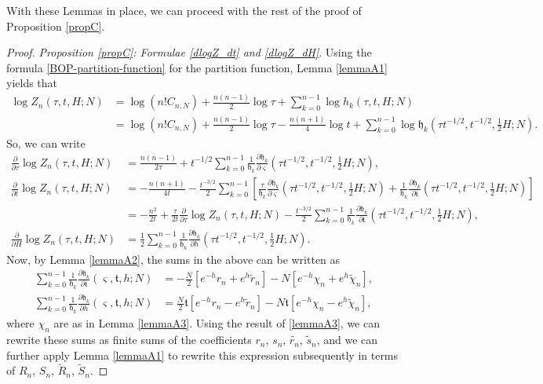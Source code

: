 \documentclass[usenames,dvipsnames]{article}
\theoremstyle{definition}
\numberwithin{equation}{section}
\numberwithin{figure}{section}
\begin{document}
    With these Lemmas in place, we can proceed with the rest of the proof of Proposition \ref{propC}.
    \begin{proof} \textit{Proposition \ref{propC}: Formulae \eqref{dlogZ_dt} and \eqref{dlogZ_dH}}.
        Using the formula \eqref{BOP-partition-function} for the partition function, Lemma \ref{lemmaA1} yields that
        \begin{align*}
            \log Z_n(\tau,t,H;N) & = \log\left(n!C_{n,N}\right) + \frac{n(n-1)}{2}\log\tau + \sum_{k=0}^{n-1}\log h_k(\tau,t,H;N)\\
            &=\log\left(n!C_{n,N}\right) + \frac{n(n-1)}{2}\log\tau - \frac{n(n+1)}{4}\log t + \sum_{k=0}^{n-1}\log \mathfrak{h}_k\left(\tau t^{-1/2},t^{-1/2},\frac{1}{2}H;N\right).
        \end{align*}
    So, we can write
        \begin{align*}
            \frac{\partial}{\partial \tau} \log Z_n(\tau,t,H;N) &= \frac{n(n-1)}{2\tau}+ t^{-1/2}\sum_{k=0}^{n-1}\frac{1}{\mathfrak{h}_k}\frac{\partial \mathfrak{h}_k}{\partial \varsigma}\left(\tau t^{-1/2},t^{-1/2},\frac{1}{2}H;N\right),\\
            \frac{\partial}{\partial t} \log Z_n(\tau,t,H;N) &= - \frac{n(n+1)}{4t}- \frac{t^{-3/2}}{2}\sum_{k=0}^{n-1}\left[\frac{\tau}{\mathfrak{h}_k}\frac{\partial \mathfrak{h}_k}{\partial \varsigma}\left(\tau t^{-1/2},t^{-1/2},\frac{1}{2}H;N\right) + \frac{1}{\mathfrak{h}_k}\frac{\partial \mathfrak{h}_k}{\partial \mathfrak{t}}\left(\tau t^{-1/2},t^{-1/2},\frac{1}{2}H;N\right) \right]\\
            &=-\frac{n^2}{2t} +\frac{\tau}{2t}\frac{\partial}{\partial \tau} \log Z_n(\tau,t,H;N) - \frac{t^{-3/2}}{2} \sum_{k=0}^{n-1}\frac{1}{\mathfrak{h}_k}\frac{\partial \mathfrak{h}_k}{\partial \mathfrak{t}}\left(\tau t^{-1/2},t^{-1/2},\frac{1}{2}H;N\right),\\
            \frac{\partial}{\partial H} \log Z_n(\tau,t,H;N) &= \frac{1}{2}\sum_{k=0}^{n-1}\frac{1}{\mathfrak{h}_k}\frac{\partial \mathfrak{h}_k}{\partial h}\left(\tau t^{-1/2},t^{-1/2},\frac{1}{2}H;N\right).
        \end{align*}
    Now, by Lemma \ref{lemmaA2}, the sums in the above can be written as
        \begin{align*}
            \sum_{k=0}^{n-1}\frac{1}{\mathfrak{h}_k}\frac{\partial \mathfrak{h}_k}{\partial \mathfrak{t}}\left(\varsigma,\mathfrak{t},h;N\right) &= -\frac{N}{2}\left[e^{-h}r_n+e^{h}\tilde{r}_n\right] -N\left[e^{-h}\chi_n+e^{h}\tilde{\chi}_n\right],\\
            \sum_{k=0}^{n-1}\frac{1}{\mathfrak{h}_k}\frac{\partial \mathfrak{h}_k}{\partial h}\left(\varsigma,\mathfrak{t},h;N\right) &= \frac{N}{2}\mathfrak{t}\left[e^{-h}r_n-e^{h}\tilde{r}_n\right] -N\mathfrak{t}\left[e^{-h}\chi_n-e^{h}\tilde{\chi}_n\right],
        \end{align*}
    where $\chi_n$ are as in Lemma \ref{lemmaA3}. Using the result of \ref{lemmaA3}, we can rewrite these sums as finite sums of the coefficients
    $r_n$, $s_n$, $\tilde{r_n}$, $\tilde{s}_n$, and we can further apply Lemma \ref{lemmaA1} to rewrite this expression subsequently in terms
    of $R_n$, $S_n$, $\tilde{R}_n$, $\tilde{S}_n$.
    \end{proof}
\end{document}
